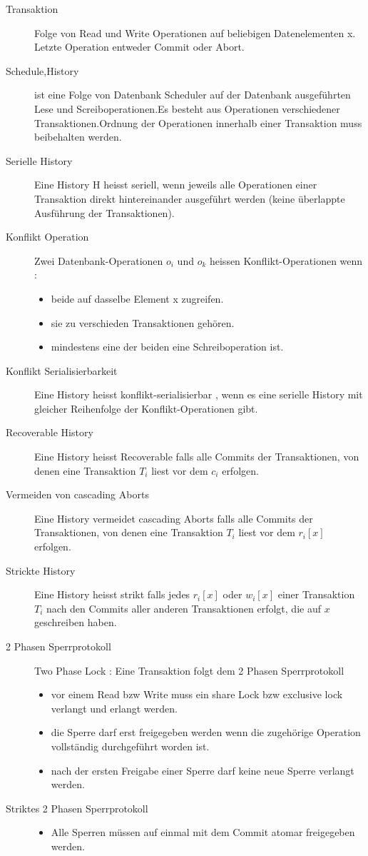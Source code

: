 \documentclass[a4paper,10pt,titlepage=false]{scrreprt}
\begin{document}
\begin{description}
 \item [Transaktion] Folge von Read und Write Operationen auf beliebigen Datenelementen x. Letzte Operation entweder 
Commit oder Abort.
\item[Schedule,History] ist eine Folge von Datenbank Scheduler auf der Datenbank ausgeführten Lese und 
Screiboperationen.Es besteht aus Operationen verschiedener Transaktionen.Ordnung der Operationen innerhalb einer 
Transaktion muss beibehalten werden.
\item[Serielle History] Eine History H heisst seriell, wenn jeweils alle Operationen einer Transaktion direkt 
hintereinander ausgeführt werden (keine überlappte Ausführung der Transaktionen).
\item[Konflikt Operation] Zwei Datenbank-Operationen $o_i$ und $o_k$ heissen Konflikt-Operationen wenn :
\begin{itemize}
 \item beide auf dasselbe Element x zugreifen.
 \item sie zu verschieden Transaktionen gehören.
 \item mindestens eine der beiden eine Schreiboperation ist.
\end{itemize}
\item[Konflikt Serialisierbarkeit] Eine History heisst konflikt-serialisierbar , wenn es eine serielle History mit 
gleicher Reihenfolge der Konflikt-Operationen gibt.
\item[Recoverable History] Eine History heisst Recoverable falls alle Commits der Transaktionen, von denen eine 
Transaktion $T_i$ liest vor dem $c_i$ erfolgen.
\item[Vermeiden von cascading Aborts] Eine History vermeidet cascading Aborts falls alle Commits der Transaktionen, von 
denen eine Transaktion $T_i$ liest vor dem $r_i[x]$  erfolgen.
\item[Strickte History] Eine History heisst strikt falls jedes $r_i[x]$ oder $w_i[x]$ einer Transaktion $T_i$ nach den 
Commits aller anderen Transaktionen erfolgt, die auf $x$ geschreiben haben.
\item[2 Phasen Sperrprotokoll] Two Phase Lock : Eine Transaktion folgt dem 2 Phasen Sperrprotokoll
\begin{itemize}
 \item vor einem Read bzw Write muss ein share Lock bzw exclusive lock verlangt und erlangt werden.
 \item die Sperre darf erst freigegeben werden wenn die zugehörige Operation vollständig durchgeführt worden ist.
 \item nach der ersten Freigabe einer Sperre darf keine neue Sperre verlangt werden.
\end{itemize}
\item[Striktes 2 Phasen Sperrprotokoll] 
\begin{itemize}
 \item Alle Sperren müssen auf einmal mit dem Commit atomar freigegeben werden.
\end{itemize}


\end{description}
\end{document}
